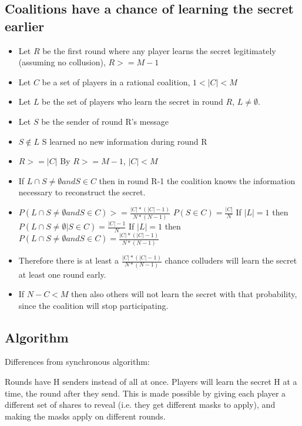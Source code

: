\documentclass{article}
\begin{document}
\subsection{Coalitions have a chance of learning the secret earlier}
\begin{itemize}
  \item Let $R$ be the first round where any player learns the secret legitimately (assuming no collusion), $R >= M-1$
  \item Let $C$ be a set of players in a rational coalition, $1 < |C| < M$
  \item Let $L$ be the set of players who learn the secret in round $R$, $L \not = \emptyset$.
  \item Let $S$ be the sender of round R's message
  \item $S \not \in L$
    \subitem S learned no new information during round R
  \item $R >= |C|$
    \subitem By $R >= M-1$, $|C| < M$
  \item If $L \cap S \not = \emptyset and S \in C$ then in round R-1 the coalition knows the information necessary to reconstruct the secret.
  \item $P(L \cap S \not = \emptyset and S \in C) >= \frac{|C|*(|C|-1)}{N*(N-1)}$
  	\subitem $P(S \in C) = \frac{|C|}{N}$
    \subitem If $|L| = 1$ then $P(L \cap S \not = \emptyset | S \in C) = \frac{|C|-1}{N}$
    \subitem If $|L| = 1$ then $P(L \cap S \not = \emptyset and S \in C) = \frac{|C|*(|C|-1)}{N*(N-1)}$
  \item Therefore there is at least a $\frac{|C|*(|C|-1)}{N*(N-1)}$ chance colluders will learn the secret at least one round early.
  \item If $N - C < M$ then also others will not learn the secret with that probability, since the coalition will stop participating. 
\end{itemize}



\subsection{Algorithm}

Differences from synchronous algorithm:

Rounds have H senders instead of all at once. Players will learn the secret H at a time, the round after they send. This is made possible by giving each player a different set of shares to reveal (i.e. they get different masks to apply), and making the masks apply on different rounds.
\end{document}
